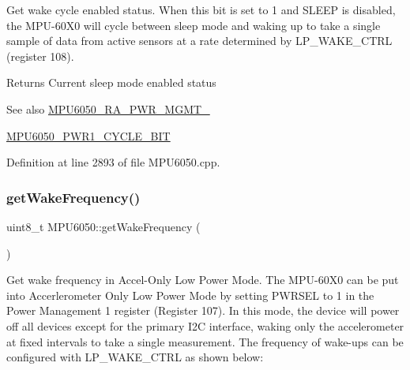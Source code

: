Get wake cycle enabled status. When this bit is set to 1 and S\+L\+E\+EP is disabled, the M\+P\+U-\/60\+X0 will cycle between sleep mode and waking up to take a single sample of data from active sensors at a rate determined by L\+P\+\_\+\+W\+A\+K\+E\+\_\+\+C\+T\+RL (register 108). \begin{DoxyReturn}{Returns}
Current sleep mode enabled status 
\end{DoxyReturn}
\begin{DoxySeeAlso}{See also}
\mbox{\hyperlink{MPU6050_8h_ac6c83146165a2307ac7155d4fa566df4}{M\+P\+U6050\+\_\+\+R\+A\+\_\+\+P\+W\+R\+\_\+\+M\+G\+M\+T\+\_}} 

\mbox{\hyperlink{MPU6050_8h_a78ae6e61ebfd0704101e073b268151d4}{M\+P\+U6050\+\_\+\+P\+W\+R1\+\_\+\+C\+Y\+C\+L\+E\+\_\+\+B\+IT}} 
\end{DoxySeeAlso}


Definition at line 2893 of file M\+P\+U6050.\+cpp.


\begin{DoxyCode}{0}

\end{DoxyCode}
\mbox{\label{classMPU6050_a249a905ae4572a462414f2d94236258a}} 
\subsubsection{\texorpdfstring{getWakeFrequency()}{getWakeFrequency()}}
{\footnotesize\ttfamily uint8\+\_\+t M\+P\+U6050\+::get\+Wake\+Frequency (\begin{DoxyParamCaption}{ }\end{DoxyParamCaption})}

Get wake frequency in Accel-\/\+Only Low Power Mode. The M\+P\+U-\/60\+X0 can be put into Accerlerometer Only Low Power Mode by setting P\+W\+R\+S\+EL to 1 in the Power Management 1 register (Register 107). In this mode, the device will power off all devices except for the primary I2C interface, waking only the accelerometer at fixed intervals to take a single measurement. The frequency of wake-\/ups can be configured with L\+P\+\_\+\+W\+A\+K\+E\+\_\+\+C\+T\+RL as shown below\+:


